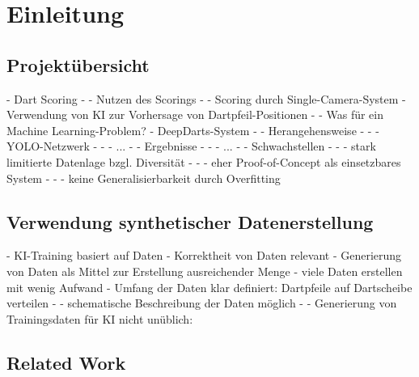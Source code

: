
\chapter{Einleitung}
\label{cha:einleitung}



\section{Projektübersicht}
\label{sec:projektuebersicht}

- Dart Scoring
- - Nutzen des Scorings
- - Scoring durch Single-Camera-System
- Verwendung von KI zur Vorhersage von Dartpfeil-Positionen
- - Was für ein Machine Learning-Problem?
- DeepDarts-System
- - Herangehensweise
- - - YOLO-Netzwerk
- - - ...
- - Ergebnisse
- - - ...
- - Schwachstellen
- - - stark limitierte Datenlage bzgl. Diversität
- - - eher Proof-of-Concept als einsetzbares System
- - - keine Generalisierbarkeit durch Overfitting



\section{Verwendung synthetischer Datenerstellung}
\label{sec:warum_daten}

- KI-Training basiert auf Daten
- Korrektheit von Daten relevant
- Generierung von Daten als Mittel zur Erstellung ausreichender Menge
- viele Daten erstellen mit wenig Aufwand
- Umfang der Daten klar definiert: Dartpfeile auf Dartscheibe verteilen
- - schematische Beschreibung der Daten möglich
- - Generierung von Trainingsdaten für KI nicht unüblich: \cite{synth_data,synth_data_blender_defects,synth_data_cars_with_cam_aug,synth_data_importance_2,synth_data_pose_estimation,synth_data_procedural}



\section{Related Work}
\label{sec:related_work}

